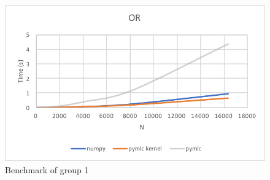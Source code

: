 \begin{figure}[]
\includegraphics[scale=0.5]{img/group1/or.pdf}
\caption{Benchmark of group 1}
\label{fig:func-or}
\end{figure}

